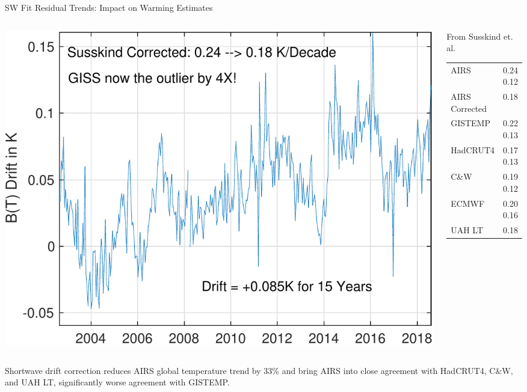 \documentclass[10pt,t]{beamer}
\begin{document}
\begin{frame}[label={sec:orga863315}]{SW Fit Residual Trends: Impact on Warming Estimates}
\begin{columns}
\begin{column}{0.6\columnwidth}
\begin{block}{}
\vspace{-0.3in}
\begin{center}
\includegraphics[width=\linewidth]{./Figs/Pdf/bt_drift_from_anom_resid_2613_chan_v2.pdf}
\end{center}
\end{block}
\end{column}

\begin{column}{0.4\columnwidth}
\begin{block}{From Susskind et. al.}
\begin{small}
\begin{center}
\begin{tabular}{ll}
AIRS & 0.24 \textpm{} 0.12\\
AIRS Corrected & 0.18\\
GISTEMP & 0.22 \textpm{} 0.13\\
HadCRUT4 & 0.17 \textpm{} 0.13\\
C\&W & 0.19 \textpm{} 0.12\\
ECMWF & 0.20 \textpm{} 0.16\\
UAH LT & 0.18\\
\end{tabular}
\end{center}
\end{small}
\end{block}
\end{column}
\end{columns}

Shortwave drift correction reduces AIRS global temperature trend by 33\% and bring AIRS into close agreement with HadCRUT4, C\&W, and UAH LT, significantly worse agreement with GISTEMP.

\vspace{-0.1in}
\end{frame}
\end{document}
